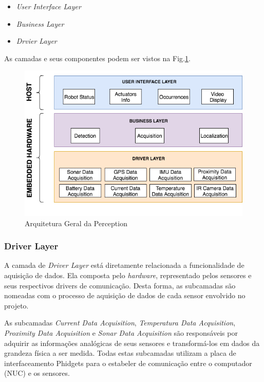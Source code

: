 \begin{itemize}
	\item \textit{User Interface Layer}
	\item \textit{Business Layer}
	\item \textit{Drvier Layer}
\end{itemize}
 
As camadas e seus componentes podem ser vistos na Fig.\ref{arqsoft}.

\begin{figure}[h]
	\centering
	\includegraphics[width=15cm]{Figures/ArquiteturadeSoftware.png}
	\caption{Arquitetura Geral da Perception}
	\label{arqsoft}
\end{figure}

\subsubsection{Driver Layer}
	
A camada de \textit{Driver Layer} está diretamente relacionada a funcionalidade de aquisição de dados. Ela composta pelo \textit{hardware}, representado pelos sensores e seus respectivos drivers de comunicação. Desta forma, as subcamadas são nomeadas com o processo de aquisição de dados de cada sensor envolvido no projeto.

As subcamadas \textit{Current Data Acquisition}, \textit{Temperatura Data Acquisition}, \textit{Proximity Data Acquisition} e \textit{Sonar Data Acquisition} são responsáveis por adquirir as informações analógicas de seus sensores e transformá-los em dados da grandeza física a ser medida. Todas estas subcamadas utilizam a placa de interfaceamento Phidgets para o estabeler de comunicação entre o computador (NUC) e os sensores.

